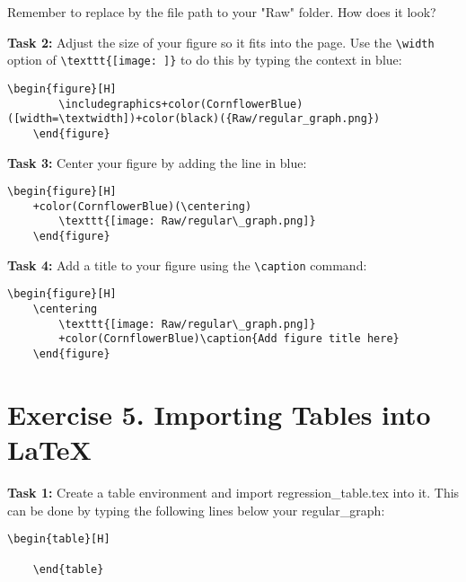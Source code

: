 \documentclass[12pts]{report}
\begin{document}
Remember to replace \color{red}{\verb|Raw/|}\color{black}{} by the file path to your "Raw" folder. How does it look? 

\textbf{Task 2:} Adjust the size of your figure so it fits into the page. Use the \verb|\width| option of \verb|\texttt{[image: ]}| to do this by typing the context in blue:
\begin{center}
	\begin{Verbatim}[commandchars=+\(\)]
	\begin{figure}[H]
		\includegraphics+color(CornflowerBlue)([width=\textwidth])+color(black)({Raw/regular_graph.png})
	\end{figure}
	\end{Verbatim}
\end{center}


\textbf{Task 3:} Center your figure by adding the line in blue:
\begin{center}
	\begin{Verbatim}[commandchars=+\(\)]
	\begin{figure}[H]
	+color(CornflowerBlue)(\centering)
		\texttt{[image: Raw/regular\_graph.png]}
	\end{figure}
	\end{Verbatim}
\end{center}

\textbf{Task 4:} Add a title to your figure using the \verb|\caption| command:
\begin{center}
	\begin{Verbatim}[commandchars=+\(\)]
	\begin{figure}[H]
	\centering
		\texttt{[image: Raw/regular\_graph.png]}
		+color(CornflowerBlue)\caption{Add figure title here}
	\end{figure}
	\end{Verbatim}
\end{center}

\section*{Exercise 5. Importing Tables into \LaTeX}
\textbf{Task 1:} Create a table environment and import regression\_table.tex into it. This can be done by typing the following lines below your regular\_graph:
\begin{center}
	\begin{Verbatim}[commandchars=+\(\)]
	\begin{table}[H]
		
	\end{table}
	\end{Verbatim}
\end{center}
\end{document}
